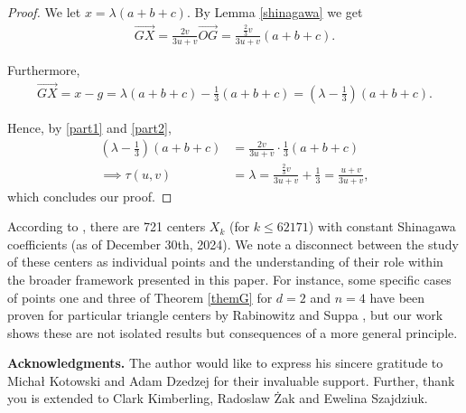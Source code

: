 \documentclass{birkjour}
\theoremstyle{definition}
\theoremstyle{remark}
\numberwithin{equation}{section}
\begin{document}
\begin{proof}
    We let $x = \lambda (a+b+c)$. By Lemma \ref{shinagawa} we get \begin{equation}\label{part1}
        \begin{split}
        \overrightarrow{GX} = \frac{2v}{3u+v} \overrightarrow{OG}  = \frac{\frac23v }{3u+v} (a+b+c).
    \end{split} 
    \end{equation} 

Furthermore, \begin{equation}\label{part2}
    \begin{split}
    \overrightarrow{GX} = x-g =  \lambda(a+b+c) - \frac13 (a+b+c) = \left(\lambda - \frac{1}{3}\right) \left(a+b+c\right).
\end{split} 
\end{equation}

Hence, by \eqref{part1} and \eqref{part2}, 
\begin{equation}
    \begin{split}
        \left(\lambda - \frac{1}{3}\right) \left(a+b+c\right) &= \frac{2v }{3u+v}\cdot \frac13 (a+b+c) \\
    \implies \tau(u,v) &= \lambda = \frac{\frac{2}{3}v }{3u+v}  + \frac{1}{3} = \frac{u+v}{3u+v},
\end{split}   
\end{equation} which concludes our proof. 
\end{proof}

According to \cite{Kimberling,TablesKimberling}, there are 721 centers $X_k$ (for $k \leq 62171$) with constant Shinagawa coefficients (as of December $30$th, 2024). We note a disconnect between the study of these centers as individual points and the understanding of their role within the broader framework presented in this paper. For instance, some specific cases of points one and three of Theorem \ref{themG} for $d=2$ and $n=4$ have been proven for particular triangle centers by Rabinowitz and Suppa \cite{Rabinowitz2025}, but our work shows these are not isolated results but consequences of a more general principle. 

\noindent \textbf{Acknowledgments.} The author would like to express his sincere gratitude to Michał Kotowski and  Adam Dzedzej for their invaluable support. Further, thank you is extended to Clark Kimberling, Radoslaw Żak and Ewelina Szajdziuk.
\end{document}
